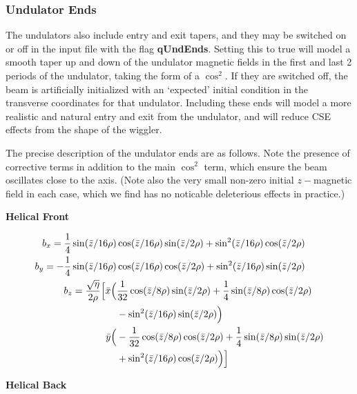 \documentclass[12pt]{article}%
\begin{document}
\subsubsection{Undulator Ends}

The undulators also include entry and exit tapers, and they may be switched on or off in the input file with the flag {\bf qUndEnds}. Setting this to true will model a smooth taper up and down of the undulator magnetic fields in the first and last 2 periods of the undulator, taking the form of a $\cos^2$. If they are switched off, the beam is artificially initialized with an `expected' initial condition in the transverse coordinates for that undulator. Including these ends will model a more realistic and natural entry and exit from the undulator, and will reduce CSE effects from the shape of the wiggler.

The precise description of the undulator ends are as follows. Note the presence of corrective terms in addition to the main $\cos^2$ term, which ensure the beam oscillates close to the axis. (Note also the very small non-zero initial $z-$magnetic field in each case, which we find  has no noticable deleterious effects in practice.)

{\bf Helical Front}

\begin{align}
b_x  =  \frac{1}{4}\sin(\bar{z}/16\rho) & \cos(\bar{z}/16\rho)    \sin(\bar{z}/2\rho)   +   \sin^2(\bar{z} / 16\rho)  \cos(\bar{z}/2\rho)  \\
b_y =  - \frac{1}{4}\sin(\bar{z}/16\rho) & \cos(\bar{z}/16\rho)    \cos(\bar{z}/2\rho)   +  \sin^2(\bar{z} / 16\rho)  \sin(\bar{z}/2\rho)\\
b_z = \frac{\sqrt{\eta}}{2\rho} \Bigl[   \bar{x}\Bigl(& \frac{1}{32}\cos( \bar{z}/8\rho )\sin(\bar{z}/2\rho) +
           \frac{1}{4}\sin(\bar{z}/8\rho)\cos(\bar{z}/2\rho) \nonumber  \\
           & - \sin^2(\bar{z}/16\rho)\sin(\bar{z}/2\rho) \Bigr) \nonumber \\
           \bar{y}\Bigl(& -\frac{1}{32}\cos( \bar{z}/8\rho )\cos(\bar{z}/2\rho) +\frac{1}{4}\sin(\bar{z}/8\rho)\sin(\bar{z}/2\rho) \nonumber  \\
           & + \sin^2(\bar{z}/16\rho)\cos(\bar{z}/2\rho) \Bigr)  \Bigr]
\end{align}


{\bf Helical Back}
\end{document}
